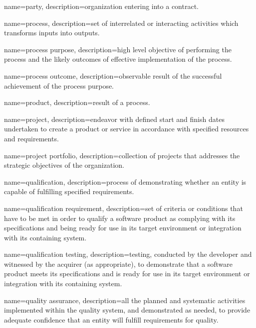 {
	name=party,
	description={organization entering into a contract.}
}

{
	name=process,
	description={set of interrelated or interacting activities which transforms inputs into outputs.}
}

{
	name=process purpose,
	description={high level objective of performing the process and the likely outcomes of effective implementation of the process.}
}

{
	name=process outcome,
	description={observable result of the successful achievement of the process purpose.}
}

{
	name=product,
	description={result of a process.}
}

{
	name=project,
	description={endeavor with defined start and finish dates undertaken to create a product or service in accordance with specified resources and requirements.}
}

{
	name=project portfolio,
	description={collection of projects that addresses the strategic objectives of the organization.}
}



{
	name=qualification,
	description={process of demonstrating whether an entity is capable of fulfilling specified requirements.}
}

{
	name=qualification requirement,
	description={set of criteria or conditions that have to be met in order to qualify a software product as complying with its specifications and being ready for use in its target environment or integration with its containing system.}
}

{
	name=qualification testing,
	description={testing, conducted by the developer and witnessed by the acquirer (as appropriate), to demonstrate that a software product meets its specifications and is ready for use in its target environment or integration with its containing system.}
}

{
	name=quality assurance,
	description={all the planned and systematic activities implemented within the quality system, and demonstrated as needed, to provide adequate confidence that an entity will fulfill requirements for quality.}
}



